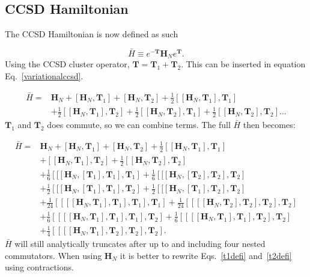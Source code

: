 \documentclass[graybox,sectrefs,envcountresetchap,open=right]{svmonodo}
\begin{document}
\subsection{CCSD Hamiltonian}

The CCSD Hamiltonian is now defined as such

\begin{equation}
\bar{H} \equiv e^{-\mathbf{T}} \mathbf{H}_N e^{\mathbf{T}}  .
\end{equation} 
Using the CCSD cluster operator, $\mathbf{T} = \mathbf{T}_1 + \mathbf{T}_2$. This can be inserted in equation Eq.~\ref{variationalccsd}. 

\begin{align}
\bar{H} = & 
\mathbf{H}_N 
+ \left[ \mathbf{H}_N, \mathbf{T}_1 \right] 
+ \left[ \mathbf{H}_N, \mathbf{T}_2 \right] 
+ \frac{1}{2} \left[ [\mathbf{H}_N, \mathbf{T}_1], \mathbf{T}_1 \right]  \\ &
+ \frac{1}{2} \left[ [\mathbf{H}_N, \mathbf{T}_1], \mathbf{T}_2  \right]
+ \frac{1}{2} \left[ [\mathbf{H}_N, \mathbf{T}_2], \mathbf{T}_1 \right]
+ \frac{1}{2} \left[ [\mathbf{H}_N, \mathbf{T}_2], \mathbf{T}_2 \right] \dots \nonumber
\end{align} 
$\mathbf{T}_1$ and $\mathbf{T}_2$ does commute, so we can combine terms. The full $\bar{H}$ then becomes:

\begin{align}
\bar{H} = & 
\mathbf{H}_N 
+ \left[ \mathbf{H}_N, \mathbf{T}_1 \right] 
+ \left[ \mathbf{H}_N, \mathbf{T}_2 \right] 
+ \frac{1}{2} \left[ [\mathbf{H}_N, \mathbf{T}_1], \mathbf{T}_1 \right] \label{temp_hamil_ccsd} \\ &
+ \left[ [\mathbf{H}_N, \mathbf{T}_1], \mathbf{T}_2  \right]
+ \frac{1}{2} \left[ [\mathbf{H}_N, \mathbf{T}_2], \mathbf{T}_2 \right] \nonumber \\ &
+ \frac{1}{6} \left[ [ [ \mathbf{H}_N,[\mathbf{T}_1], \mathbf{T}_1], \mathbf{T}_1 \right]
+ \frac{1}{6} \left[ [ [ \mathbf{H}_N,[\mathbf{T}_2], \mathbf{T}_2], \mathbf{T}_2 \right] \nonumber \\ &
+ \frac{1}{2} \left[ [ [ \mathbf{H}_N,[\mathbf{T}_1], \mathbf{T}_1], \mathbf{T}_2 \right]
+ \frac{1}{2} \left[ [ [ \mathbf{H}_N,[\mathbf{T}_1], \mathbf{T}_2], \mathbf{T}_2 \right] \nonumber \\ &
+ \frac{1}{24} \left[ [ [ [\mathbf{H}_N, \mathbf{T}_1], \mathbf{T}_1], \mathbf{T}_1], \mathbf{T}_1  \right]
+ \frac{1}{24} \left[ [ [ [\mathbf{H}_N, \mathbf{T}_2], \mathbf{T}_2], \mathbf{T}_2], \mathbf{T}_2  \right] \nonumber \\ &
+ \frac{1}{6} \left[ [ [ [\mathbf{H}_N, \mathbf{T}_1], \mathbf{T}_1], \mathbf{T}_1], \mathbf{T}_2  \right]
+ \frac{1}{6} \left[ [ [ [\mathbf{H}_N, \mathbf{T}_1], \mathbf{T}_1], \mathbf{T}_2], \mathbf{T}_2  \right] \nonumber \\ &
+ \frac{1}{4} \left[ [ [ [\mathbf{H}_N, \mathbf{T}_1], \mathbf{T}_2], \mathbf{T}_2], \mathbf{T}_2  \right] . \nonumber
\end{align} 
$\bar{H}$ will still analytically truncates after up to and including four nested commutators. When using $\mathbf{H}_N$ it is better to rewrite Eqs.~\ref{t1defi} and~\ref{t2defi} using contractions.
\end{document}
